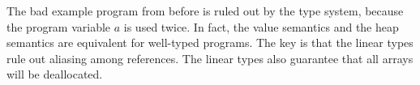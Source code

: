 \documentclass{article}
\newcommand{\kw}[1]{\ensuremath{\mathsf{#1}}}
\newcommand{\bool}{\ensuremath{\kw{bool}}}
\newcommand{\tyint}{\ensuremath{\kw{int}}}
\newcommand{\tyarray}{\ensuremath{\kw{array}}}
\newcommand{\linto}{\ensuremath{\multimap}}
\newcommand{\true}{\ensuremath{\kw{true}}}
\newcommand{\false}{\ensuremath{\kw{false}}}
\newcommand{\IF}[3]{\ensuremath{\kw{if}\ #1\ \kw{then}\ #2\ \kw{else}\ #3}}
\newcommand{\Colon}{{\hspace{1pt}:\hspace{1pt}}}
\newcommand{\COLON}{\mathrel{\,:\,}}
\newcommand{\fun}{\ensuremath{\kw{fun}}}
\newcommand{\fix}[5]{\fun\ #1\ (#2\Colon#3):#4 = #5}
\newcommand{\hastype}[3]{\ensuremath{#1\mathrel{\,\vdash\,}#2 \COLON #3}}
\newcommand{\haslintype}[3]{\ensuremath{#1\mathrel{\,\Vdash\,}#2 \COLON #3}}
\begin{document}
{
\def\MathparLineskip {\lineskiplimit=1.2em\lineskip=2.5em plus 0.2em}

{
\setlength{\fboxsep}{5pt}
\fbox{\haslintype{\gamma}{e}{\tau}}
}
}

The bad example program from before is ruled out by the type
system, because the program variable $a$ is used twice.
In fact, the value semantics and the heap semantics are equivalent for
well-typed programs. The key is that the linear types rule out
aliasing among references.
The linear types also guarantee that all arrays will be deallocated.
\end{document}
